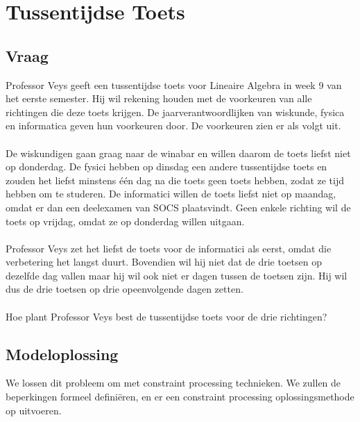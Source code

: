\documentclass[alternative-exam.tex]{subfiles}
\begin{document}
\chapter{Tussentijdse Toets}

\section{Vraag}
Professor Veys geeft een tussentijdse toets voor Lineaire Algebra in week 9 van het eerste semester.
Hij wil rekening houden met de voorkeuren van alle richtingen die deze toets krijgen. De jaarverantwoordlijken van wiskunde, fysica en informatica geven hun voorkeuren door. De voorkeuren zien er als volgt uit.\\\\
De wiskundigen gaan graag naar de winabar en willen daarom de toets liefst niet op donderdag. De fysici hebben op dinsdag een andere tussentijdse toets en zouden het liefst minstens één dag na die toets geen toets hebben, zodat ze tijd hebben om te studeren. De informatici willen de toets liefst niet op maandag, omdat er dan een deelexamen van SOCS plaatsvindt. Geen enkele richting wil de toets op vrijdag, omdat ze op donderdag willen uitgaan.\\\\
Professor Veys zet het liefst de toets voor de informatici als eerst, omdat die verbetering het langst duurt. Bovendien wil hij niet dat de drie toetsen op dezelfde dag vallen maar hij wil ook niet er dagen tussen de toetsen zijn. Hij wil dus de drie toetsen op drie opeenvolgende dagen zetten.\\\\
Hoe plant Professor Veys best de tussentijdse toets voor de drie richtingen?

\section{Modeloplossing}
We lossen dit probleem om met constraint processing technieken. We zullen de beperkingen formeel defini\"eren, en er een constraint processing oplossingsmethode op uitvoeren.
\end{document}
